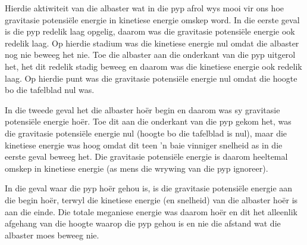  Hierdie aktiwiteit van die albaster wat in die pyp afrol wys mooi vir ons hoe gravitasie potensiële energie in kinetiese energie omskep word. In die eerste geval is die pyp redelik laag opgelig, daarom was die gravitasie potensiële energie ook redelik laag. Op hierdie stadium was die kinetiese energie nul omdat die albaster nog nie beweeg het nie. Toe die albaster aan die onderkant van die pyp uitgerol het, het dit redelik stadig beweeg en daarom was die kinetiese energie ook redelik laag. Op hierdie punt was die gravitasie potensiële energie nul omdat die hoogte bo die tafelblad nul was.

In die tweede geval het die albaster hoër begin en daarom was sy gravitasie potensiële energie hoër.  Toe dit aan die onderkant van die pyp gekom het, was die gravitasie potensiële energie nul (hoogte bo die tafelblad is nul), maar die kinetiese energie was hoog omdat dit teen  'n baie vinniger snelheid as in die eerste geval beweeg het. Die gravitasie potensiële energie is daarom heeltemal omskep in kinetiese energie (as mens die wrywing van die pyp ignoreer).

In die geval waar die pyp hoër gehou is, is die gravitasie potensiële energie aan die begin hoër, terwyl die kinetiese energie (en snelheid) van die albaster hoër is aan die einde. Die totale meganiese energie was daarom hoër en dit het alleenlik afgehang van die hoogte waarop die pyp gehou is en nie die afstand wat die albaster moes beweeg nie.


